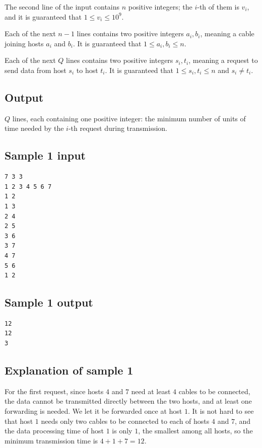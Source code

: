 \documentclass[11pt]{article}
\begin{document}
The second line of the input contains $n$ positive integers;
the $i$-th of them is $v_i$,
and it is guaranteed that $1 \le v_i \le 10^9$.

Each of the next $n-1$ lines contains two positive integers $a_i, b_i$,
meaning a cable joining hosts $a_i$ and $b_i$.
It is guaranteed that $1 \le a_i, b_i \le n$.

Each of the next $Q$ lines contains two positive integers $s_i, t_i$,
meaning a request to send data from host $s_i$ to host $t_i$.
It is guaranteed that $1 \le s_i, t_i \le n$ and $s_i \ne t_i$.

\subsection*{Output}

$Q$ lines, each containing one positive integer:
the minimum number of units of time needed by the $i$-th request during
transmission.

\subsection*{Sample 1 input}

\begin{verbatim}
7 3 3
1 2 3 4 5 6 7
1 2
1 3
2 4
2 5
3 6
3 7
4 7
5 6
1 2
\end{verbatim}

\subsection*{Sample 1 output}

\begin{verbatim}
12
12
3
\end{verbatim}

\subsection*{Explanation of sample 1}

For the first request, since hosts $4$ and $7$ need at least $4$ cables to
be connected,
the data cannot be transmitted directly between the two hosts,
and at least one forwarding is needed.
We let it be forwarded once at host $1$.
It is not hard to see that host $1$ needs only two cables to be connected
to each of hosts $4$ and $7$,
and the data processing time of host $1$ is only $1$,
the smallest among all hosts,
so the minimum transmission time is $4 + 1 + 7 = 12$.
\end{document}

